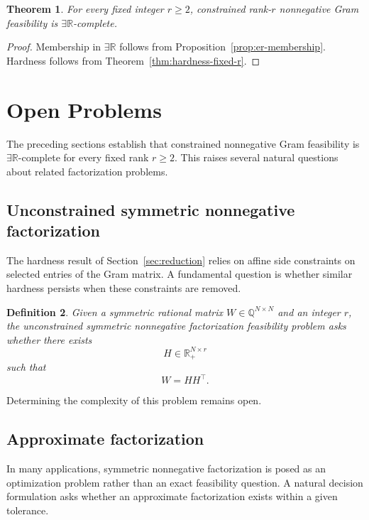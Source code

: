 \documentclass[11pt]{article}
\newtheorem{theorem}{Theorem}[section]
\newtheorem{definition}[theorem]{Definition}
\begin{document}
\begin{theorem}
\label{thm:classification-fixed}
For every fixed integer \(r\ge 2\), constrained rank-$r$ nonnegative Gram
feasibility is \(\exists\mathbb{R}\)-complete.
\end{theorem}

\begin{proof}
Membership in \(\exists\mathbb{R}\) follows from
Proposition~\ref{prop:er-membership}. Hardness follows from
Theorem~\ref{thm:hardness-fixed-r}.
\end{proof}
\section{Open Problems}
\label{sec:open}

The preceding sections establish that constrained nonnegative Gram
feasibility is $\exists\mathbb{R}$-complete for every fixed rank
$r \ge 2$. This raises several natural questions about related
factorization problems.

\subsection{Unconstrained symmetric nonnegative factorization}

The hardness result of Section~\ref{sec:reduction} relies on affine
side constraints on selected entries of the Gram matrix. A fundamental
question is whether similar hardness persists when these constraints
are removed.

\begin{definition}
Given a symmetric rational matrix $W\in\mathbb{Q}^{N\times N}$ and an integer
$r$, the \emph{unconstrained symmetric nonnegative factorization feasibility
problem} asks whether there exists
\[
H\in\mathbb{R}_+^{N\times r}
\]
such that
\[
W = HH^\top .
\]
\end{definition}

Determining the complexity of this problem remains open.

\subsection{Approximate factorization}

In many applications, symmetric nonnegative factorization is posed as
an optimization problem rather than an exact feasibility question.
A natural decision formulation asks whether an approximate factorization
exists within a given tolerance.
\end{document}
